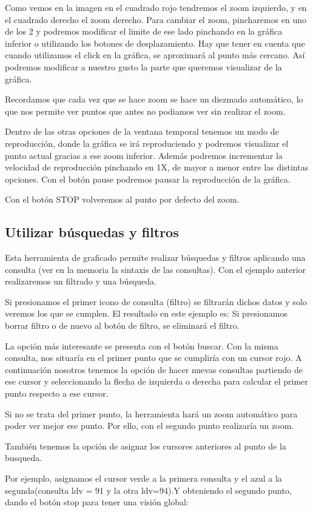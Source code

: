 Como vemos en la imagen en el cuadrado rojo tendremos el zoom izquierdo, y en el cuadrado derecho el zoom derecho.
Para cambiar el zoom, pincharemos en uno de los 2 y podremos modificar el limite de ese lado pinchando en la gráfica inferior o utilizando los botones de desplazamiento. Hay que tener en cuenta que cuando utilizamos el click en la gráfica, se aproximará al punto más cercano.
Así podremos modificar a nuestro gusto la parte que queremos visualizar de la gráfica.

Recordamos que cada vez que se hace zoom se hace un diezmado automático, lo que nos permite ver puntos que antes no podiamos ver sin realizar el zoom.

Dentro de las otras opciones de la ventana temporal tenemos un modo de reproducción, donde la gráfica se irá reproduciendo y podremos visualizar el punto actual gracias a ese zoom inferior.
Además podremos incrementar la velocidad de reproducción pinchando en 1X, de mayor a menor entre las distintas opciones.
Con el botón pause podremos pausar la reproducción de la gráfica.

Con el botón STOP volveremos al punto por defecto del zoom.


\subsection{Utilizar búsquedas y filtros}
Esta herramienta de graficado permite realizar búsquedas y filtros aplicando una consulta (ver en la memoria la sintaxis de las consultas).
Con el ejemplo anterior realizaremos un filtrado y una búsqueda.

Si presionamos el primer icono de consulta (filtro) se filtrarán dichos datos y solo veremos los que se cumplen. El resultado en este ejemplo es:
Si presionamos borrar filtro o de nuevo al botón de filtro, se eliminará el filtro.

La opción más interesante se presenta con el botón buscar.
Con la misma consulta, nos situaría en el primer punto que se cumpliría con un cursor rojo.
A continuación nosotros tenemos la opción de hacer nuevas consultas partiendo de ese cursor y seleccionando la flecha de izquierda o derecha para calcular el primer punto respecto a ese cursor.

Si no se trata del primer punto, la herramienta hará un zoom automático para poder ver mejor ese punto.
Por ello, con el segundo punto realizaría un zoom.

También tenemos la opción de asignar los cursores anteriores al punto de la busqueda.

Por ejemplo, asignamos el cursor verde a la primera consulta y el azul a la segunda(consulta ldv = 91 y la otra ldv=94).Y obteniendo el segundo punto, dando el botón stop para tener una visión global:



